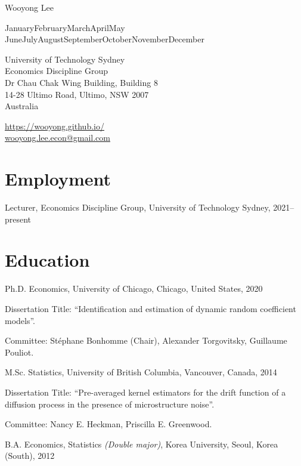 \documentclass[10pt,letterpaper]{article}
\def\name{Wooyong Lee}
\newcommand{\titlefont}[1]{{\titleface\large\MakeUppercase{#1}}}
\renewenvironment{itemize}{
  \begin{list}{}{
      \setlength{\leftmargin}{1.5em}
      \setlength{\itemsep}{0.25em}
      \setlength{\parskip}{0pt}
      \setlength{\parsep}{0.25em}
    }
}{
  \end{list}
}
\renewcommand{\today}{\ifcase \month \or January\or February\or March\or April\or May%
\or June\or July\or August\or September\or October\or November\or December\fi%
\space \number \year}
\begin{document}
{\huge \name}


\bigskip
\today

\bigskip
\begin{minipage}[t]{0.495\textwidth}
  University of Technology Sydney \\
  Economics Discipline Group \\
  Dr Chau Chak Wing Building, Building 8 \\
  14-28 Ultimo Road, Ultimo, NSW 2007 \\
  Australia
\end{minipage}
\begin{minipage}[t]{0.495\textwidth}
  \href{https://wooyong.github.io/}{https://wooyong.github.io/} \\
  \href{mailto:wooyong.lee.econ@gmail.com}{wooyong.lee.econ@gmail.com} \\
\end{minipage}

\section*{Employment}

\begin{itemize}
\item Lecturer, Economics Discipline Group, University of Technology Sydney, 2021--present
\end{itemize}

\section*{Education}

\begin{itemize}
  \item Ph.D. Economics, University of Chicago, Chicago, United States, 2020
    \begin{itemize}
    \item Dissertation Title: ``Identification and estimation of dynamic random coefficient models''.
    \item Committee: St\'ephane Bonhomme (Chair), Alexander Torgovitsky, Guillaume Pouliot.
    \end{itemize}
  \item M.Sc. Statistics, University of British Columbia, Vancouver, Canada, 2014
    \begin{itemize}
    \item Dissertation Title: ``Pre-averaged kernel estimators for the drift function of a diffusion process in the presence of microstructure noise''.
    \item Committee: Nancy E. Heckman, Priscilla E. Greenwood.
    \end{itemize}
  \item B.A. Economics, Statistics \textit{(Double major)}, Korea University, Seoul, Korea (South), 2012
\end{itemize}
\end{document}
